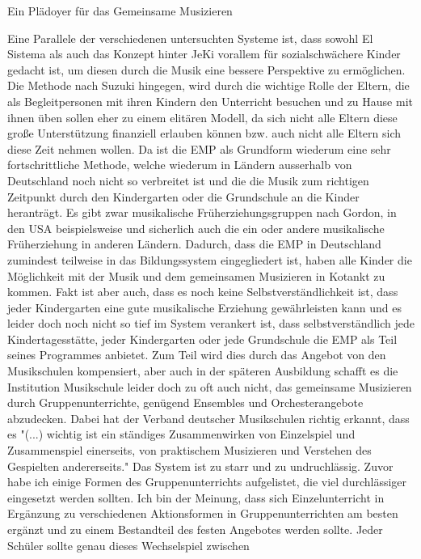 Ein Plädoyer für das Gemeinsame Musizieren

Eine Parallele der verschiedenen untersuchten Systeme ist, dass sowohl El Sistema als auch das Konzept hinter JeKi vorallem
für sozialschwächere Kinder gedacht ist, um diesen durch die Musik eine bessere
Perspektive zu ermöglichen. Die Methode nach Suzuki hingegen, wird durch die
wichtige Rolle der Eltern, die als Begleitpersonen mit ihren Kindern den
Unterricht besuchen und zu Hause mit ihnen üben sollen eher zu einem elitären
Modell, da sich nicht alle Eltern diese große Unterstützung finanziell erlauben
können bzw. auch nicht alle Eltern sich diese Zeit nehmen wollen. 
Da ist die EMP als Grundform wiederum eine sehr fortschrittliche Methode, welche
wiederum in Ländern ausserhalb von Deutschland noch nicht so verbreitet ist und die die Musik zum
richtigen Zeitpunkt durch den Kindergarten oder die Grundschule an die Kinder
heranträgt. Es gibt zwar musikalische Früherziehungsgruppen nach Gordon, in den
USA beispielsweise und sicherlich auch die ein oder andere musikalische
Früherziehung in anderen Ländern. Dadurch, dass die EMP in Deutschland zumindest teilweise in das Bildungssystem
eingegliedert ist, haben
alle Kinder die Möglichkeit mit der Musik und dem gemeinsamen Musizieren in
Kotankt zu kommen. Fakt ist aber auch, dass es noch keine Selbstverständlichkeit
ist, dass jeder Kindergarten eine gute musikalische Erziehung gewährleisten kann
und es leider doch noch nicht so tief im System verankert ist, dass
selbstverständlich jede Kindertagesstätte, jeder Kindergarten oder jede Grundschule die EMP als Teil seines Programmes
anbietet. Zum Teil wird dies durch das Angebot von den Musikschulen kompensiert,
aber auch in der späteren Ausbildung schafft es die Institution Musikschule
leider doch zu oft auch nicht, das gemeinsame Musizieren durch
Gruppenunterrichte, genügend Ensembles und Orchesterangebote abzudecken. Dabei
hat der Verband deutscher Musikschulen richtig erkannt, dass es "(...)
wichtig ist ein ständiges Zusammenwirken von Einzelspiel und Zusammenspiel
einerseits, von praktischem Musizieren und Verstehen des Gespielten
andererseits." \autocite[22]{losert:die_kunst_zu_unterrichten}
Das System ist zu starr und zu undruchlässig. Zuvor habe ich einige Formen des
Gruppenunterrichts aufgelistet, die viel durchlässiger eingesetzt werden
sollten. Ich bin der Meinung, dass sich Einzelunterricht in Ergänzung zu
verschiedenen Aktionsformen in Gruppenunterrichten am besten ergänzt und zu einem
Bestandteil des festen Angebotes werden sollte. 
Jeder Schüler sollte genau dieses Wechselspiel zwischen
